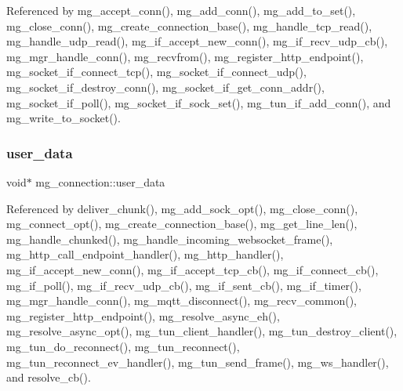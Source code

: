 Referenced by mg\+\_\+accept\+\_\+conn(), mg\+\_\+add\+\_\+conn(), mg\+\_\+add\+\_\+to\+\_\+set(), mg\+\_\+close\+\_\+conn(), mg\+\_\+create\+\_\+connection\+\_\+base(), mg\+\_\+handle\+\_\+tcp\+\_\+read(), mg\+\_\+handle\+\_\+udp\+\_\+read(), mg\+\_\+if\+\_\+accept\+\_\+new\+\_\+conn(), mg\+\_\+if\+\_\+recv\+\_\+udp\+\_\+cb(), mg\+\_\+mgr\+\_\+handle\+\_\+conn(), mg\+\_\+recvfrom(), mg\+\_\+register\+\_\+http\+\_\+endpoint(), mg\+\_\+socket\+\_\+if\+\_\+connect\+\_\+tcp(), mg\+\_\+socket\+\_\+if\+\_\+connect\+\_\+udp(), mg\+\_\+socket\+\_\+if\+\_\+destroy\+\_\+conn(), mg\+\_\+socket\+\_\+if\+\_\+get\+\_\+conn\+\_\+addr(), mg\+\_\+socket\+\_\+if\+\_\+poll(), mg\+\_\+socket\+\_\+if\+\_\+sock\+\_\+set(), mg\+\_\+tun\+\_\+if\+\_\+add\+\_\+conn(), and mg\+\_\+write\+\_\+to\+\_\+socket().

\mbox{\label{structmg__connection_ab6d66a4eacc5d4d15f817ce98f26322d_ab6d66a4eacc5d4d15f817ce98f26322d}} 
\subsubsection{\texorpdfstring{user\+\_\+data}{user\_data}}
{\footnotesize\ttfamily void$\ast$ mg\+\_\+connection\+::user\+\_\+data}



Referenced by deliver\+\_\+chunk(), mg\+\_\+add\+\_\+sock\+\_\+opt(), mg\+\_\+close\+\_\+conn(), mg\+\_\+connect\+\_\+opt(), mg\+\_\+create\+\_\+connection\+\_\+base(), mg\+\_\+get\+\_\+line\+\_\+len(), mg\+\_\+handle\+\_\+chunked(), mg\+\_\+handle\+\_\+incoming\+\_\+websocket\+\_\+frame(), mg\+\_\+http\+\_\+call\+\_\+endpoint\+\_\+handler(), mg\+\_\+http\+\_\+handler(), mg\+\_\+if\+\_\+accept\+\_\+new\+\_\+conn(), mg\+\_\+if\+\_\+accept\+\_\+tcp\+\_\+cb(), mg\+\_\+if\+\_\+connect\+\_\+cb(), mg\+\_\+if\+\_\+poll(), mg\+\_\+if\+\_\+recv\+\_\+udp\+\_\+cb(), mg\+\_\+if\+\_\+sent\+\_\+cb(), mg\+\_\+if\+\_\+timer(), mg\+\_\+mgr\+\_\+handle\+\_\+conn(), mg\+\_\+mqtt\+\_\+disconnect(), mg\+\_\+recv\+\_\+common(), mg\+\_\+register\+\_\+http\+\_\+endpoint(), mg\+\_\+resolve\+\_\+async\+\_\+eh(), mg\+\_\+resolve\+\_\+async\+\_\+opt(), mg\+\_\+tun\+\_\+client\+\_\+handler(), mg\+\_\+tun\+\_\+destroy\+\_\+client(), mg\+\_\+tun\+\_\+do\+\_\+reconnect(), mg\+\_\+tun\+\_\+reconnect(), mg\+\_\+tun\+\_\+reconnect\+\_\+ev\+\_\+handler(), mg\+\_\+tun\+\_\+send\+\_\+frame(), mg\+\_\+ws\+\_\+handler(), and resolve\+\_\+cb().

